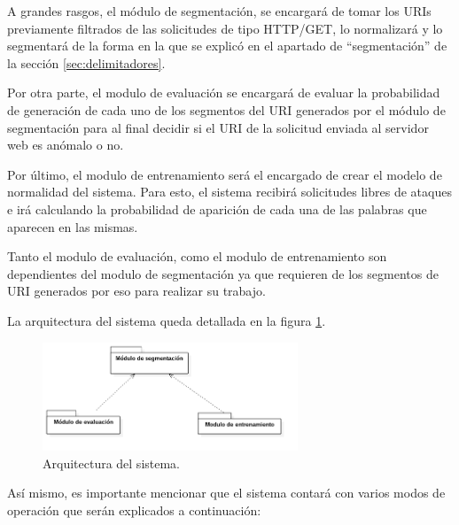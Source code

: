 A grandes rasgos, el módulo de segmentación, se encargará de tomar los URIs previamente filtrados de las solicitudes de tipo HTTP/GET, lo normalizará y lo segmentará de la forma en la que se explicó en el apartado de ``segmentación'' de la sección \ref{sec:delimitadores}.

Por otra parte, el modulo de evaluación se encargará de evaluar la probabilidad de generación de cada uno de los segmentos del URI generados por el módulo de segmentación para al final decidir si el URI de la solicitud enviada al servidor web es anómalo o no.

Por último, el modulo de entrenamiento será el encargado de crear el modelo de normalidad del sistema. Para esto, el sistema recibirá solicitudes libres de ataques e irá calculando la probabilidad de aparición de cada una de las palabras que aparecen en las mismas.

Tanto el modulo de evaluación, como el modulo de entrenamiento son dependientes del modulo de segmentación ya que requieren de los segmentos de URI generados por eso para realizar su trabajo. 

La arquitectura del sistema queda detallada en la figura \ref{fig:arquitectura}.

\begin{figure}[!htb]
\begin{center}
\includegraphics[width=3in]{./img/arquitectura.png}
\caption{Arquitectura del sistema.}
\label{fig:arquitectura}
\end{center}
\end{figure}


Así mismo, es importante mencionar que el sistema contará con varios modos de operación que serán explicados a continuación:

